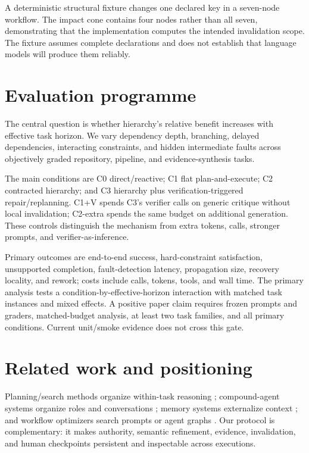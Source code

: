 \documentclass{article}
\begin{document}
A deterministic structural fixture changes one declared key in a seven-node workflow. The impact cone contains four nodes rather than all seven, demonstrating that the implementation computes the intended invalidation scope. The fixture assumes complete declarations and does not establish that language models will produce them reliably.

\section{Evaluation programme}
The central question is whether hierarchy's relative benefit increases with effective task horizon. We vary dependency depth, branching, delayed dependencies, interacting constraints, and hidden intermediate faults across objectively graded repository, pipeline, and evidence-synthesis tasks.

The main conditions are C0 direct/reactive; C1 flat plan-and-execute; C2 contracted hierarchy; and C3 hierarchy plus verification-triggered repair/replanning. C1+V spends C3's verifier calls on generic critique without local invalidation; C2-extra spends the same budget on additional generation. These controls distinguish the mechanism from extra tokens, calls, stronger prompts, and verifier-as-inference.

Primary outcomes are end-to-end success, hard-constraint satisfaction, unsupported completion, fault-detection latency, propagation size, recovery locality, and rework; costs include calls, tokens, tools, and wall time. The primary analysis tests a condition-by-effective-horizon interaction with matched task instances and mixed effects. A positive paper claim requires frozen prompts and graders, matched-budget analysis, at least two task families, and all primary conditions. Current unit/smoke evidence does not cross this gate.

\section{Related work and positioning}
Planning/search methods organize within-task reasoning \citep{yao2023react,yao2023tot,besta2024got,prasad2024adapt,zhou2024lats}; compound-agent systems organize roles and conversations \citep{li2023camel,wu2023autogen,chen2024agentverse,hong2024metagpt}; memory systems externalize context \citep{packer2023memgpt,wang2024hiagent}; and workflow optimizers search prompts or agent graphs \citep{khattab2024dspy,hu2025adas}. Our protocol is complementary: it makes authority, semantic refinement, evidence, invalidation, and human checkpoints persistent and inspectable across executions.
\end{document}
